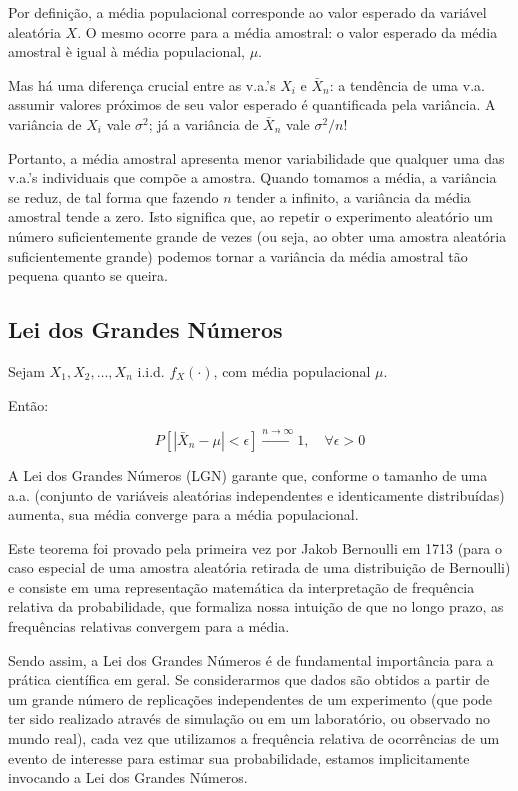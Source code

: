 \documentclass[
]{book}
\theoremstyle{definition}
\theoremstyle{definition}
\theoremstyle{definition}
\theoremstyle{remark}
\begin{document}
Por definição, a média populacional corresponde ao valor esperado da variável aleatória \(X\). O mesmo ocorre para a média amostral: o valor esperado da média amostral è igual à média populacional, \(\mu\).

Mas há uma diferença crucial entre as v.a.'s \(X_i\) e \(\bar{X}_n\): a tendência de uma v.a. assumir valores próximos de seu valor esperado é quantificada pela variância. A variância de \(X_i\) vale \(\sigma^2\); já a variância de \(\bar{X}_n\) vale \(\sigma^2/n\)!

Portanto, a média amostral apresenta menor variabilidade que qualquer uma das v.a.'s individuais que compõe a amostra. Quando tomamos a média, a variância se reduz, de tal forma que fazendo \(n\) tender a infinito, a variância da média amostral tende a zero. Isto significa que, ao repetir o experimento aleatório um número suficientemente grande de vezes (ou seja, ao obter uma amostra aleatória suficientemente grande) podemos tornar a variância da média amostral tão pequena quanto se queira.

\hypertarget{lei-dos-grandes-nuxfameros}{%
\subsection*{Lei dos Grandes Números}\label{lei-dos-grandes-nuxfameros}}

Sejam \(X_1, X_2, \ldots, X_n\) i.i.d. \(f_X(\cdot)\), com média populacional \(\mu\).

Então:

\[P\left[|\bar{X}_n - \mu| < \epsilon \right] \stackrel{n \rightarrow \infty}{\longrightarrow} 1, \quad \forall \epsilon > 0\]

A Lei dos Grandes Números (LGN) garante que, conforme o tamanho de uma a.a. (conjunto de variáveis aleatórias independentes e identicamente distribuídas) aumenta, sua média converge para a média populacional.

Este teorema foi provado pela primeira vez por Jakob Bernoulli em 1713 (para o caso especial de uma amostra aleatória retirada de uma distribuição de Bernoulli) e consiste em uma representação matemática da interpretação de frequência relativa da probabilidade, que formaliza nossa intuição de que no longo prazo, as frequências relativas convergem para a média.

Sendo assim, a Lei dos Grandes Números é de fundamental importância para a prática científica em geral. Se considerarmos que dados são obtidos a partir de um grande número de replicações independentes de um experimento (que pode ter sido realizado através de simulação ou em um laboratório, ou observado no mundo real), cada vez que utilizamos a frequência relativa de ocorrências de um evento de interesse para estimar sua probabilidade, estamos implicitamente invocando a Lei dos Grandes Números.
\end{document}
